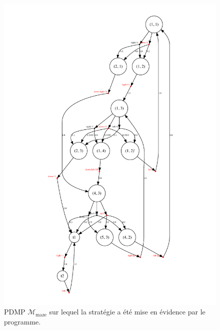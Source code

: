 \documentclass[12pt,a4paper]{report}
\theoremstyle{definition}%
\theoremstyle{remark}
\begin{document}
\begin{figure}
	\begin{minipage}{0.5\textwidth}
		\centering
		\captionsetup{justification=centering}
		\includegraphics[scale=0.5]{figures/agent_stochastic_maze_strat.pdf}
		\caption{PDMP $\mathcal{M}_{\text{maze}}$ sur lequel la stratégie a été mise en évidence par le programme.}
		\label{maze-strat-figure}
	\end{minipage}
	\begin{minipage}{0.5\textwidth}
		\centering
		\captionsetup{justification=centering}

\end{minipage}
\end{figure}
\end{document}
